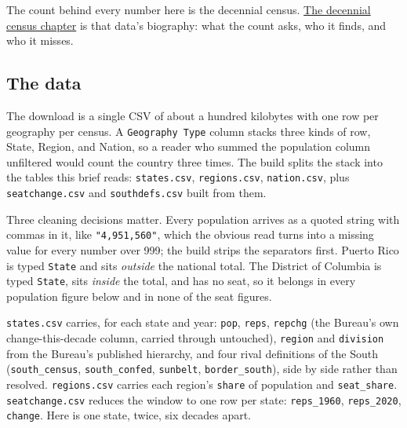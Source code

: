 \documentclass[
]{article}
\newcounter{none} %
\begin{document}
The count behind every number here is the decennial census.
\href{../census-decennial/census-decennial-brief.html}{The decennial
census chapter} is that data's biography: what the count asks, who it
finds, and who it misses.

\subsection{The data}\label{the-data}

The download is a single CSV of about a hundred kilobytes with one row
per geography per census. A \texttt{Geography\ Type} column stacks three
kinds of row, State, Region, and Nation, so a reader who summed the
population column unfiltered would count the country three times. The
build splits the stack into the tables this brief reads:
\texttt{states.csv}, \texttt{regions.csv}, \texttt{nation.csv}, plus
\texttt{seatchange.csv} and \texttt{southdefs.csv} built from them.

Three cleaning decisions matter. Every population arrives as a quoted
string with commas in it, like \texttt{"4,951,560"}, which the obvious
read turns into a missing value for every number over 999; the build
strips the separators first. Puerto Rico is typed \texttt{State} and
sits \emph{outside} the national total. The District of Columbia is
typed \texttt{State}, sits \emph{inside} the total, and has no seat, so
it belongs in every population figure below and in none of the seat
figures.

\texttt{states.csv} carries, for each state and year: \texttt{pop},
\texttt{reps}, \texttt{repchg} (the Bureau's own change-this-decade
column, carried through untouched), \texttt{region} and
\texttt{division} from the Bureau's published hierarchy, and four rival
definitions of the South (\texttt{south\_census},
\texttt{south\_confed}, \texttt{sunbelt}, \texttt{border\_south}), side
by side rather than resolved. \texttt{regions.csv} carries each region's
\texttt{share} of population and \texttt{seat\_share}.
\texttt{seatchange.csv} reduces the window to one row per state:
\texttt{reps\_1960}, \texttt{reps\_2020}, \texttt{change}. Here is one
state, twice, six decades apart.
\end{document}
